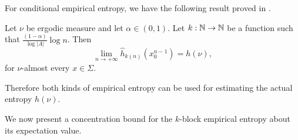 For conditional empirical entropy, we have the following result proved in \cite[Theorem II.3.5]{shields:ergodic}.

\begin{theorem} \label{thm:entropy-estimation}
	 Let $\nu$ be ergodic measure and let $\alpha \in (0, 1)$. Let $k : \mathbb{N} \to \mathbb{N}$ be a function such that $\frac{(1 - \alpha)}{\log{|A|}}\log{n}$. Then
	 \[
	 	\lim_{n \to +\infty}{\hat{h}_{k(n)}(x_0^{n - 1})} = h(\nu),
	 \]
	 for $\nu$-almost every $x \in \Sigma$.
\end{theorem}

Therefore both kinds of empirical entropy can be used for estimating the actual entropy $h(\nu)$.

We now present a concentration bound for the $k$-block empirical entropy about its expectation value.

